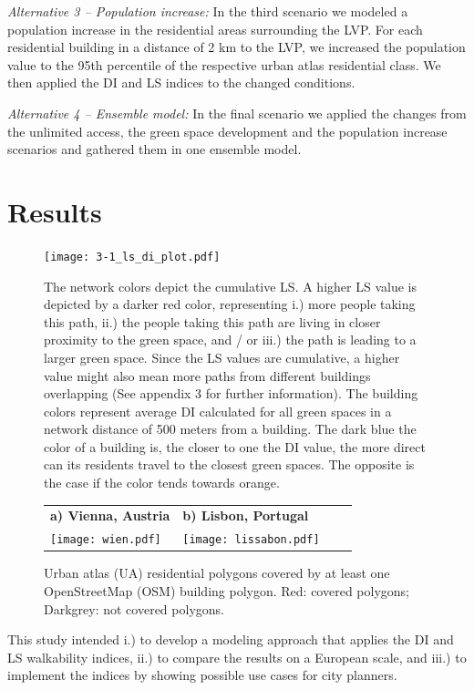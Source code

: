 \documentclass[10pt]{article}
\begin{document}
\textit{Alternative 3 – Population increase:} In the third scenario we modeled a population increase in the residential areas surrounding the LVP.
For each residential building in a distance of 2 km to the LVP, we increased the population value to the 95th percentile of the respective urban atlas residential class.
We then applied the DI and LS indices to the changed conditions.

\textit{Alternative 4 – Ensemble model:} In the final scenario we applied the changes from the unlimited access, the green space development and the population increase scenarios and gathered them in one ensemble model. 



\section{Results}

\begin{figure}
\centering
\texttt{[image: 3-1\_ls\_di\_plot.pdf]}
\caption{The network colors depict the cumulative LS. A higher LS value is depicted by a darker red color, representing i.) more people taking this path, ii.) the people taking this path are living in closer proximity to the green space, and / or iii.) the path is leading to a larger green space. Since the LS values are cumulative, a higher value might also mean more paths from different buildings overlapping (See appendix 3 for further information). The building colors represent average DI calculated for all green spaces in a network distance of 500 meters from a building. The dark blue the color of a building is, the closer to one the DI value, the more direct can its residents travel to the closest green spaces. The opposite is the case if the color tends towards orange.}
\label{fig:lsdi}
\end{figure}

\begin{figure}[h!]
\centering
\begin{tabular}{llll}
\textbf{a) Vienna, Austria} & \textbf{b) Lisbon, Portugal} \\
\texttt{[image: wien.pdf]} & \texttt{[image: lissabon.pdf]}
\end{tabular}
\caption{Urban atlas (UA) residential polygons covered by at least one OpenStreetMap (OSM) building polygon. Red: covered polygons; Darkgrey: not covered polygons.}
\label{fig:osmcovexample}
\end{figure}

This study intended i.) to develop a modeling approach that applies the DI and LS walkability indices, ii.) to compare the results on a European scale, and iii.) to implement the indices by showing possible use cases for city planners.
\end{document}
